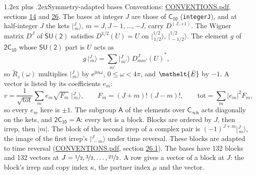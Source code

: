 \documentclass[10pt,a4paper]{article}
\makeatletter
\renewcommand\section{\@startsection{section}{1}{\z@}{-3ex plus -1ex minus -.2ex}%
  {1.2ex plus .2ex}{\normalfont\large\sffamily\bfseries\color{parttitle}}}
\numberwithin{equation}{section}
\newcommand{\eltfont}[1]{{\let\sigma\eltsigma\mathelt{#1}}}
\newcommand{\grp}[1]{\mathsf{#1}}
\newcommand{\elt}[1]{\eltfont{#1}}
\newcommand{\iunit}{\mathrm{i}}
\newcommand{\expe}{\mathrm{e}}
\newcommand{\irrJp}[2]{D^{(#1,#2)}}
\newcommand{\wignerD}[1]{D^{#1}}
\newcommand{\conj}[1]{{#1}^{*}}
\newcommand{\mult}{\kappa}
\newcommand{\intx}{\mu}
\newcommand{\jm}[2]{\bigl\lvert{}^{#1}_{\,#2}\bigr\rangle}
\newcommand{\barred}[1]{\bar{#1}}
\newcommand{\lift}[1]{\tilde{#1}}
\makeatother
\begin{document}
\section{Symmetry-adapted bases}\label{s:bases}
Conventions: \href{../../CONVENTIONS.pdf}{CONVENTIONS.pdf}, sections \href{../../../rotation/CONVENTIONS.pdf\#conv.14}{14} and \href{../../CONVENTIONS.pdf\#conv.26}{26}.
\leavevmode\label{n:index.m}\label{n:vector.ket}The bases at integer $J$ are those of \href{../../../rotation/data/pdf/C10.pdf}{$\grp{C_{10}}$} (\texttt{integerJ}), and at half-integer $J$ the kets $\jm{J}{m}$, $m = J, J-1, \dots, -J$, carry $\irrJp{J}{+1}$. \label{n:matrix.wigner}The Wigner matrix $\wignerD{J}$ of $\grp{SU(2)}$ satisfies $\wignerD{1/2}(U) = U$ on $\jm{1/2}{1/2}$, $\jm{1/2}{-1/2}$. The element $g$ of $\grp{2C_{10}}$ whose $\grp{SU(2)}$ part is $U$ acts as
\begin{equation}\label{e:action}g\,\jm{J}{m} = \sum_{m'} \jm{J}{m'}\; \conj{\wignerD{J}_{m m'}(U)},\end{equation}
so $\lift{R}_{z}(\omega)$ multiplies $\jm{J}{m}$ by $\expe^{\iunit m\omega}$, $0 \le \omega < 4\pi$, and $\elt{\barred{E}}$ by $-1$. \label{n:index.ketcoefficient}\label{n:vector.basis.symmetry}\label{n:index.ketweight}\label{n:index.total}A vector is listed by its coefficients $e_m$:
\begin{equation}\label{e:ket}v = \frac{1}{\sqrt{\mathrm{tot}}}\sum_m e_m\sqrt{F_m}\;\jm{J}{m},\qquad F_m = (J+m)!\,(J-m)!,\qquad \mathrm{tot} = \sum_m |e_m|^2F_m,\end{equation}
so every $e_m$ here is $\pm 1$.
\leavevmode\label{n:group.A}The subgroup $\grp{A}$ of the elements over $\grp{C_{\infty h}}$ acts diagonally on the kets, and $\grp{2C_{10}} = \grp{A}$: every ket is a block. Blocks are ordered by $J$, then irrep, then $|m|$. The block of the second irrep of a complex pair is $(-1)^{J+m}\jm{J}{m}$, the image of the first irrep's $\jm{J}{-m}$ under time reversal. These blocks are adapted to time reversal (\href{../../CONVENTIONS.pdf}{CONVENTIONS.pdf}, section \href{../../CONVENTIONS.pdf\#conv.26.1}{26.1}).
The bases have 132 blocks and 132 vectors at $J = \nicefrac{1}{2}, \nicefrac{3}{2}, \dots, \nicefrac{21}{2}$. \label{n:index.copy}\label{n:head.vector}A row gives a vector of a block at $J$: the block's irrep and copy index $\mult$, the partner index $\intx$ and the vector.
\end{document}
